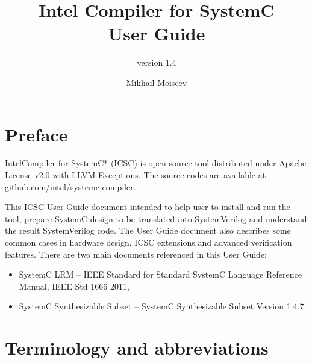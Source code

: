 



\title[Intel Compiler for SystemC User Guide]{Intel Compiler for SystemC \\ User Guide}
\subtitle{version 1.4}

\author{Mikhail Moiseev}
\ifdefined\INTEL
\else
{}
\fi


\maketitle
\pagebreak

\setcounter{tocdepth}{2}
\tableofcontents


\pagebreak

\section{Preface}

Intel\textregistered Compiler for SystemC* (ICSC) is open source tool distributed under \href{https://github.com/intel/systemc-compiler/blob/main/LICENSE.txt}{Apache License v2.0 with LLVM Exceptions}. The source codes are available at \href{https://github.com/intel/systemc-compiler}{github.com/intel/systemc-compiler}.

This ICSC User Guide document intended to help user to install and run the tool, prepare SystemC design to be translated into SystemVerilog and understand the result SystemVerilog code. The User Guide document also describes some common cases in hardware design, ICSC extensions and advanced verification features.
%
There are two main documents referenced in this User Guide: 
\begin{itemize}
\item SystemC LRM -- IEEE Standard for Standard SystemC Language Reference Manual, IEEE Std 1666 2011,
\item SystemC Synthesizable Subset -- SystemC Synthesizable Subset Version 1.4.7. 
\end{itemize}

\section{Terminology and abbreviations}

